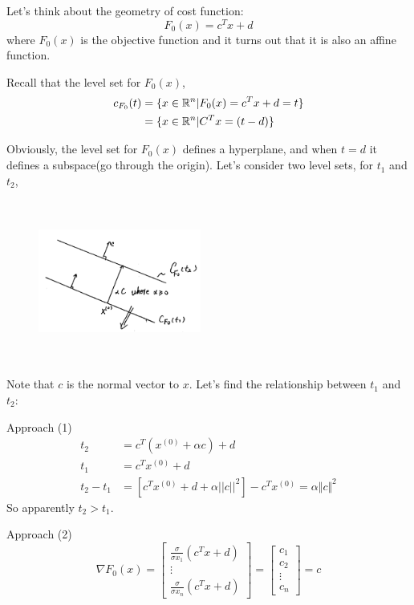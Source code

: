 Let's think about the geometry of cost function:
$$
F_0(x) =c^Tx + d
$$
where $F_0(x)$ is the objective function and it turns out that it is also an affine function.

Recall that the level set for $F_0(x)$, 
\begin{align*}
	c_{F_0}(t) &=\{ x\in \mathbb{R}^n | F_0(x) = c^Tx + d = t \}\\
	&= \{x\in \mathbb{R}^n | C^Tx = (t-d) \}
\end{align*}

Obviously, the level set for $F_0(x)$ defines a hyperplane, and when $t=d$ it defines a subspace(go through the origin). Let's consider two level sets, for $t_1$ and $t_2$,

\begin{figure}
	\centering
	\includegraphics[width=2.1in,height=2.1in]{figures/ch07/figure1012_1.png}
\end{figure}

Note that $c$ is the normal vector to $x$. Let's find the relationship between $t_1$ and $t_2$:

Approach (1)
\begin{align*}
	t_2 &= c^T(x^{(0)}+\alpha c) + d\\
	t_1 &= c^Tx^{(0)} + d\\
	t_2 - t_1 &= [c^Tx^{(0)} + d + \alpha ||c||^2] - c^Tx^{(0)} = \alpha \Vert c \Vert^2
\end{align*}
So apparently $t_2>t_1$.

Approach (2)
\begin{equation*}
	\nabla F_0(x) =
	\begin{bmatrix}
		\frac{\sigma}{\sigma x_1}(c^Tx+d)\\
		\vdots\\
		\frac{\sigma}{\sigma x_n}(c^Tx+d)
	\end{bmatrix} = 
	\begin{bmatrix}
		c_1\\
		c_2\\
		\vdots\\
		c_n
	\end{bmatrix} = c
\end{equation*}

